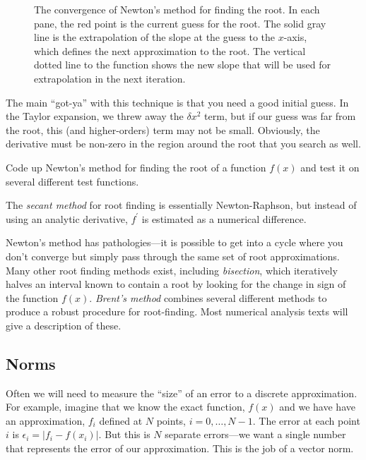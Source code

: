 \begin{figure}
\caption[Convergence of Newton's method for root
  finding]{\label{fig:newtonsmethod} The convergence of Newton's
  method for finding the root.  In each pane, the red point is the
  current guess for the root.  The solid gray line is the
  extrapolation of the slope at the guess to the $x$-axis, which
  defines the next approximation to the root.  The vertical dotted
  line to the function shows the new slope that will be used for
  extrapolation in the next iteration.}
\end{figure}


The main ``got-ya'' with this technique is that you need a good initial
guess.  In the Taylor expansion, we threw away the $\delta x^2$ term,
but if our guess was far from the root, this (and higher-orders) term
may not be small.  Obviously, the derivative must be non-zero in the
region around the root that you search as well.

\begin{exercise}
{Code up Newton's method for finding the root of a function $f(x)$
and test it on several different test functions.}
\end{exercise}
The {\em secant method} for root finding is essentially
Newton-Raphson, but instead of using an analytic derivative,
$f^\prime$ is estimated as a numerical difference.

Newton's method has pathologies---it is possible to get into a cycle
where you don't converge but simply pass through the same set of root
approximations.  Many other root finding methods exist, including {\em
  bisection}, which iteratively halves an interval known to contain a
root by looking for the change in sign of the function $f(x)$.  {\em
  Brent's method} combines several different methods to produce a
robust procedure for root-finding.  Most numerical analysis texts will
give a description of these.

\subsection{Norms}

\label{intro:sec:norm}

Often we will need to measure the ``size'' of an error to a discrete
approximation.  For example, imagine that we know the exact function,
$f(x)$ and we have have an approximation, $f_i$ defined at $N$ points,
$i = 0, \ldots, N-1$.  The error at each point $i$ is $\epsilon_i =
|f_i - f(x_i)|$.  But this is $N$ separate errors---we want a single
number that represents the error of our approximation.  This is the
job of a vector norm.  

